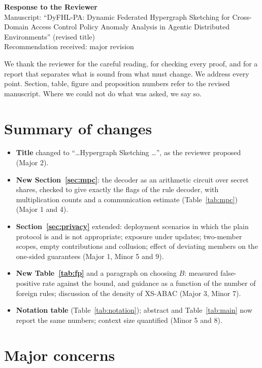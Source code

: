 \documentclass[11pt,a4paper]{article}
\begin{document}
\begin{center}
{\Large\bfseries Response to the Reviewer}\\[4pt]
Manuscript: ``DyFHL-PA: Dynamic Federated Hypergraph Sketching for Cross-Domain Access Control Policy Anomaly Analysis in Agentic Distributed Environments'' (revised title)\\
Recommendation received: major revision
\end{center}

We thank the reviewer for the careful reading, for checking every proof, and for a report that separates what is sound from what must change. We address every point. Section, table, figure and proposition numbers refer to the revised manuscript. Where we could not do what was asked, we say so.

\section*{Summary of changes}
\begin{itemize}
\item \textbf{Title} changed to ``\ldots Hypergraph Sketching \ldots'', as the reviewer proposed (Major 2).
\item \textbf{New Section~\ref{sec:mpc}}: the decoder as an arithmetic circuit over secret shares, checked to give exactly the flags of the rule decoder, with multiplication counts and a communication estimate (Table~\ref{tab:mpc}) (Major 1 and 4).
\item \textbf{Section~\ref{sec:privacy}} extended: deployment scenarios in which the plain protocol is and is not appropriate; exposure under updates; two-member scopes, empty contributions and collusion; effect of deviating members on the one-sided guarantees (Major 1, Minor 5 and 9).
\item \textbf{New Table~\ref{tab:fp}} and a paragraph on choosing $B$: measured false-positive rate against the bound, and guidance as a function of the number of foreign rules; discussion of the density of XS-ABAC (Major 3, Minor 7).
\item \textbf{Notation table} (Table~\ref{tab:notation}); abstract and Table~\ref{tab:main} now report the same numbers; context size quantified (Minor 5 and 8).
\end{itemize}

\section*{Major concerns}
\end{document}
